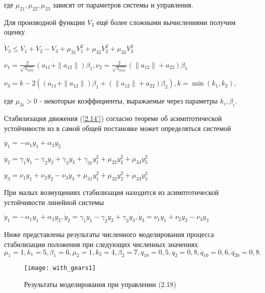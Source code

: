 где $\mu_{21}, \mu_{22}, \mu_{23}$ зависят от параметров системы и управления.

Для производной функции $V_3$ ещё более сложными вычислениями получим оценку

$\dot V_3 \le V_1 + V_2 - V_3 + \mu_{31} V_1^2 + \mu_{32} V_2^2 + \mu_{33} V_3^2$

$\nu_1 = \frac{2}{\sqrt{\lambda_{min}}} (a_{11} + \| a_{12} \|) \beta_1, \nu_2 = \frac{2}{\sqrt{\lambda_{min}}} (\| a_{12} \| + a_{22}) \beta_1$

$\nu_3 = k - 2 ((a_{11} + \| a_{12} \|) \beta_1 + (\| a_{12} \| + a_{22}) \beta_2), k = \min (k_1, k_2), $

где $\mu_{3i} > 0$ - некоторые коэффициенты, выражаемые через параметры $k_i, \beta_i$.

Стабилизация движения (\ref{2.14'}) согласно теореме об асимптотической устойчивости из \cite{matrosov01} в самой общей постановке может определяться системой

$\dot y_1 = - \alpha_1 y_1 + \alpha_2 y_2$

$\dot y_2 = \gamma_1 y_1 - \gamma_2 y_2 + \gamma_3 y_3 + \gamma_{31} y_1^2 + \mu_{22} y_2^2 + \mu_{33} y_3^2$

$\dot y_3 = \nu_1 y_1 + \nu_2 y_2 - \nu_3 y_3 + \mu_{31} y_1^2 + \mu_{32} y_2^2 + \mu_{33} y_3^2$

При малых возмущениях стабилизация находится из асимптотической устойчивости линейной системы

$\dot y_1 = - \alpha_1 y_1 + \alpha_2 y_2, \dot y_2 = \gamma_1 y_1 - \gamma_2 y_2 + \gamma_3 y_3, \dot y_3 = \nu_1 y_1 + \nu_2 y_2 - \nu_3 y_3$

Ниже представлены результаты численного моделирования процесса стабилизации положения при следующих численных значениях $\mu_1 = 1, k_1 = 5, \beta_1 = 6, \mu_2 = 1, k_2 = 4, \beta_2 = 7, q_{10} = 0,5, q_2 = 0,8, \dot q_{10} = 0,6, \dot q_{20} = 0,8.$ 

\begin{figure}[H]
	\centering
	\texttt{[image: with\_gears1]}
	\caption{Результаты моделирования при управлении (2.18)}
	\label{fig:manip22}
\end{figure}